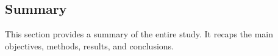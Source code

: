 \subsection{Summary}

This section provides a summary of the entire study. It recaps the main objectives, methods, results, and conclusions.